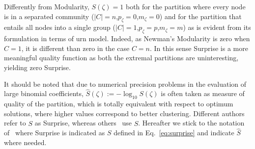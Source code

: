 Differently from Modularity, $S(\zeta)=1$ both for the partition where every node is in a separated community ($|C|=n$,$p_\zeta=0$,$m_\zeta=0$) and for the partition that entails all nodes into a single group ($|C|=1$,$p_\zeta=p$,$m_\zeta=m$) as is evident from its formulation in terms of urn model. Indeed, as Newman's Modularity is zero when $C=1$, it is different than zero in the case $C=n$. In this sense Surprise is a more meaningful quality function as both the extremal partitions are uninteresting, yielding zero Surprise.

It should be noted that due to numerical precision problems in the evaluation of large binomial coefficients, $\hat{S}(\zeta) := -\log_{10}S(\zeta)$ is often taken as measure of quality of the partition, which is totally equivalent with respect to optimum solutions, where higher values correspond to better clustering.
Different authors~\cite{arnauVMarsS2005,fleck2014} refer to $S$ as Surprise, whereas others~\cite{aldecoa2011,aldecoa2013} use $\hat{S}$. Hereafter we stick to the notation of~\cite{fleck2014} where Surprise is indicated as $S$ defined in Eq.~\ref{eq:surprise} and indicate $\hat{S}$ where needed.


